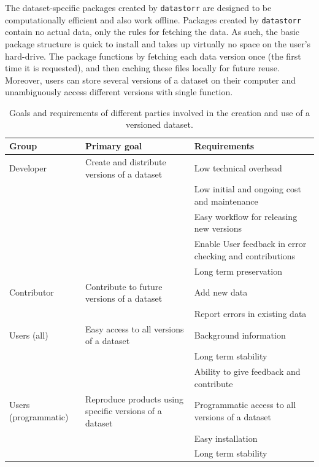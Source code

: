 \documentclass[a4paper,num-refs]{assets/oup-contemporary}
\begin{document}
The dataset-specific packages created by \texttt{datastorr} are designed to be computationally efficient and also work offline. Packages created by \texttt{datastorr} contain no actual data, only the rules for fetching the data. As such, the basic package structure is quick to install and takes up virtually no space on the user's hard-drive. The package functions by fetching each data version once (the first time it is requested), and then caching these files locally for future reuse. Moreover, users can store several versions of a dataset on their computer and unambiguously access different versions with single function.

\begin{table}[t!]
\centering
\caption{Goals and requirements of different parties involved in the creation and use of a versioned dataset.}
\vspace{0.2cm}
  \begin{tabular}{p{3cm}p{7cm}p{6cm}}
  \hline
  \textbf{Group} & \textbf{Primary goal} & \textbf{Requirements} \\ \hline
  Developer & Create and distribute versions of a dataset & Low technical overhead \\
    & & Low initial and ongoing cost and maintenance \\
    & & Easy workflow for releasing new versions \\
    & & Enable User feedback in error checking and contributions \\
    & & Long term preservation \\
  Contributor & Contribute to future versions of a dataset & Add new data \\
    & & Report errors in existing data \\
  Users (all) & Easy access to all versions of a dataset & Background information\\
    & & Long term stability \\
    & & Ability to give feedback and contribute \\
  Users (programmatic) & Reproduce products using specific versions of a dataset & Programmatic access to all versions of a dataset \\
    & & Easy installation \\
    & & Long term stability \\
  \hline
  \end{tabular}
\label{tab:user_requirements}
\end{table}
\end{document}
